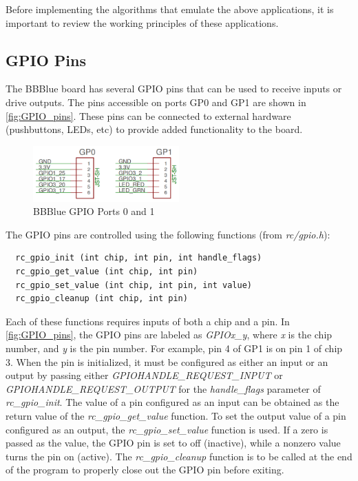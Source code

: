 Before implementing the algorithms that emulate the above applications, it is important to review the working principles of these applications.

\subsection{GPIO Pins}
\label{sec:GPIOPins}
The BBBlue board has several GPIO pins that can be used to receive inputs or drive outputs. The pins accessible on ports GP0 and GP1 are shown in \autoref{fig:GPIO_pins}. These pins can be connected to external hardware (pushbuttons, LEDs, etc) to provide added functionality to the board.
%
\begin{figure}
  \centering
  \includegraphics[width= 0.5\textwidth]{figs/img/Lab1/GPIO_pins.png}
  \caption{BBBlue GPIO Ports 0 and 1}
  \label{fig:GPIO_pins}
\end{figure}
%
The GPIO pins are controlled using the following functions (from \emph{rc/gpio.h}):
\begin{verbatim}
  rc_gpio_init (int chip, int pin, int handle_flags)
  rc_gpio_get_value (int chip, int pin)
  rc_gpio_set_value (int chip, int pin, int value)
  rc_gpio_cleanup (int chip, int pin)
\end{verbatim}
Each of these functions requires inputs of both a chip and a pin. In \autoref{fig:GPIO_pins}, the GPIO pins are labeled as \emph{GPIOx\_y}, where \emph{x} is the chip number, and \emph{y} is the pin number. For example, pin 4 of GP1 is on pin 1 of chip 3. When the pin is initialized, it must be configured as either an input or an output by passing either \emph{GPIOHANDLE\_REQUEST\_INPUT} or \emph{GPIOHANDLE\_REQUEST\_OUTPUT} for the \emph{handle\_flags} parameter of \emph{rc\_gpio\_init}. The value of a pin configured as an input can be obtained as the return value of the \emph{rc\_gpio\_get\_value} function. To set the output value of a pin configured as an output, the \emph{rc\_gpio\_set\_value} function is used. If a zero is passed as the value, the GPIO pin is set to off (inactive), while a nonzero value turns the pin on (active). The \emph{rc\_gpio\_cleanup} function is to be called at the end of the program to properly close out the GPIO pin before exiting.


